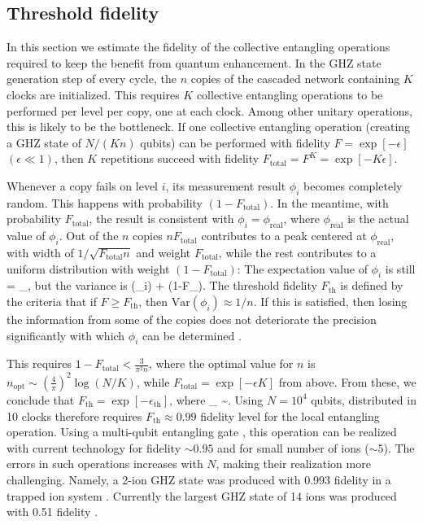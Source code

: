 \subsection{Threshold fidelity}
In this section we estimate the fidelity of the collective entangling operations
required to keep the benefit from quantum enhancement.
In the GHZ state generation step of every cycle, the $n$ copies of the cascaded
network containing $K$ clocks are initialized. This requires $K$ collective
entangling operations to be performed per level per copy, one at each clock.
Among other unitary operations, this is likely to be the bottleneck. If one
collective entangling operation (creating a GHZ state of $N/(Kn)$ qubits) can be
performed with fidelity $F = \exp[-\epsilon]$ $(\epsilon \ll 1)$, then $K$
repetitions succeed with fidelity $F_\mathrm{total} = F^{K}= \exp[-K\epsilon ]$.

Whenever a copy fails on level $i$, its measurement result $\phi_i$ becomes
completely random. This happens with probability
$(1-F_\mathrm{total})$.
In the meantime, with probability $F_\mathrm{total}$, the result is consistent with
$\phi_i = \phi_\mathrm{real}$, where $\phi_\mathrm{real}$ is the actual value of
$\phi_i $. Out of the $n$ copies $nF_\mathrm{total}$ contributes to a peak
centered at $\phi_\mathrm{real}$, with width of $1/\sqrt{F_\mathrm{total}n}$ and
weight $F_\mathrm{total}$, while the rest contributes to a uniform distribution
with weight $(1-F_\mathrm{total})$:
The expectation value of $\phi_i$ is still
\bel
 	 = \phi_,
\eel
but the variance is
 \bel
 	(\phi_i) \approx {} +
 	(1-F_).
 \eel 
The threshold fidelity $F_\mathrm{th}$ is defined by the criteria that if $F \geq
F_\mathrm{th}$, then $\mathrm{Var}(\phi_i) \approx 1/n$. If this is satisfied, then
losing the information from some of the copies does not deteriorate
 the precision significantly with which $\phi_i$ can be determined .

This requires $1-F_\mathrm{total} < \frac{3}{\pi^2 n}$, where the optimal value
for $n$ is $n_\mathrm{opt}\sim \left(\frac{4}{\pi}\right)^2\log(N/K)$, while
$F_\mathrm{total}= \exp[-\epsilon K]$ from above. From these, we conclude that $F_\mathrm{th} =
\exp[-\epsilon_\mathrm{th}]$, where
\bel
	\epsilon_ \approx {} \sim {}.
\eel 
 Using $N=10^4$ qubits, distributed in 10 clocks  therefore requires
 $F_\mathrm{th} \approx 0.99$ fidelity level for the local entangling operation.
Using a multi-qubit entangling gate \cite{MSgate}, this operation can be
realized with current technology for fidelity $\sim 0.95$ and for
small number of ions ($\sim 5$). \cite{Monz2011} The errors in such operations
increases with $N$, making their realization more challenging. Namely, a 2-ion
GHZ state was produced with 0.993 fidelity in a trapped ion system
\cite{Benhelm2008}.
Currently the largest GHZ state of 14 ions was produced with 0.51 fidelity
\cite{Monz2011}.
